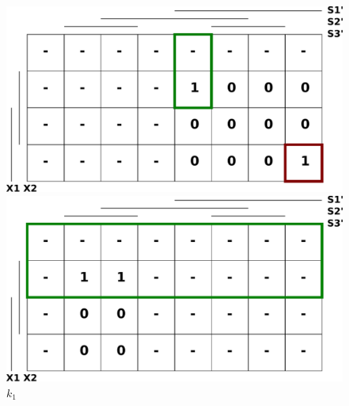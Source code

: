 \documentclass[titlepage]{article}
\begin{document}
\begin{center}
\begin{figure}[ht!]
\begin{minipage}[b]{0.45\linewidth}
\includegraphics[width=\textwidth]{karnaugh_j1.pdf}
	\caption{$j_1$}
\end{minipage}
\begin{minipage}[b]{0.45\linewidth}
\includegraphics[width=\textwidth]{karnaugh_k1.pdf}
	\caption{$k_1$}
\end{minipage}
\end{figure}


\end{center}
\end{document}
